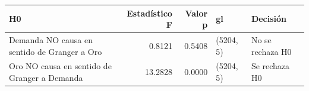 \begin{tabular}{lrrll}
\toprule
H0 & Estadístico F & Valor p & gl & Decisión \\
\midrule
Demanda NO causa en sentido de Granger a Oro & 0.8121 & 0.5408 & (5204, 5) & No se rechaza H0 \\
Oro NO causa en sentido de Granger a Demanda & 13.2828 & 0.0000 & (5204, 5) & Se rechaza H0 \\
\bottomrule
\end{tabular}
